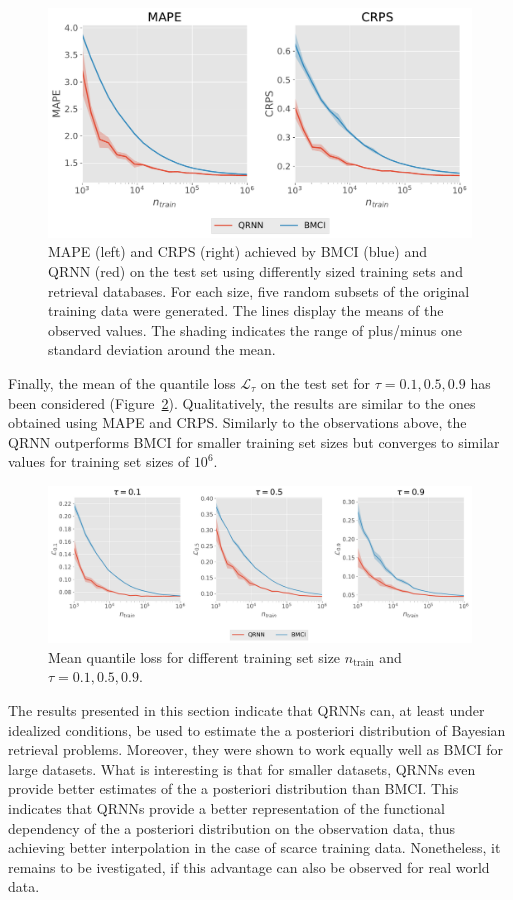 \documentclass[journal abbreviation, manuscript]{copernicus}
\begin{document}
  \begin{figure}[hbpt!]
    \includegraphics[width = 0.5\linewidth]{../plots/mape_crps}
    \caption{MAPE (left) and CRPS (right) achieved by BMCI (blue) and QRNN (red)
      on the test set using differently sized training sets and retrieval
    databases. For each size, five random subsets of the original training data were
    generated. The lines display the means of the observed values. The shading
    indicates the range of plus/minus one standard deviation around the mean.}
    \label{fig:mape_crps}
  \end{figure}

Finally, the mean of the quantile loss $\mathcal{L}_\tau$ on the test set for
$\tau = 0.1, 0.5, 0.9$ has been considered (Figure~\ref{fig:quantile_losses}).
Qualitatively, the results are similar to the ones obtained using MAPE and CRPS.
Similarly to the observations above, the QRNN outperforms BMCI for smaller
 training set sizes but converges to similar values for training set sizes
 of $10^6$.

  \begin{figure}[hbpt!]
    \centering
    \includegraphics[width = 0.8\linewidth]{../plots/quantile_losses}
    \caption{Mean quantile loss for different training set size $n_\text{train}$ and
    $\tau = 0.1, 0.5, 0.9$.}
    \label{fig:quantile_losses}
  \end{figure}

The results presented in this section indicate that QRNNs can, at least
under idealized conditions, be used to estimate the a posteriori distribution of 
Bayesian retrieval problems. Moreover, they were shown to work equally well
as BMCI for large datasets. What is interesting is that for smaller datasets,
QRNNs even provide better estimates of the a posteriori distribution than BMCI.
This indicates that QRNNs provide a better representation of the functional
dependency of the a posteriori distribution on the observation data, thus
achieving better interpolation in the case of scarce training data. Nonetheless,
 it remains to be ivestigated, if this advantage can also be observed for real
world data.
\end{document}
